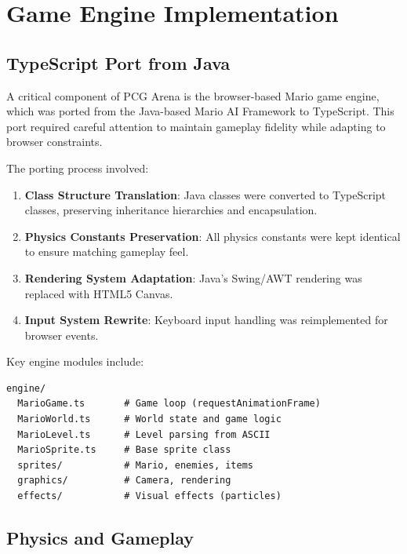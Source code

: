 \documentclass[11pt,a4paper]{article}
\theoremstyle{plain}
\theoremstyle{definition}
\theoremstyle{remark}
\begin{document}
\section{Game Engine Implementation}
\label{sec:engine}

\subsection{TypeScript Port from Java}
\label{subsec:ts-port}

A critical component of PCG Arena is the browser-based Mario game engine, which was ported from the Java-based Mario AI Framework to TypeScript. This port required careful attention to maintain gameplay fidelity while adapting to browser constraints.

The porting process involved:

\begin{enumerate}
    \item \textbf{Class Structure Translation}: Java classes were converted to TypeScript classes, preserving inheritance hierarchies and encapsulation.
    \item \textbf{Physics Constants Preservation}: All physics constants were kept identical to ensure matching gameplay feel.
    \item \textbf{Rendering System Adaptation}: Java's Swing/AWT rendering was replaced with HTML5 Canvas.
    \item \textbf{Input System Rewrite}: Keyboard input handling was reimplemented for browser events.
\end{enumerate}

Key engine modules include:

\begin{lstlisting}
engine/
  MarioGame.ts       # Game loop (requestAnimationFrame)
  MarioWorld.ts      # World state and game logic
  MarioLevel.ts      # Level parsing from ASCII
  MarioSprite.ts     # Base sprite class
  sprites/           # Mario, enemies, items
  graphics/          # Camera, rendering
  effects/           # Visual effects (particles)
\end{lstlisting}

\subsection{Physics and Gameplay}
\label{subsec:physics}
\end{document}
